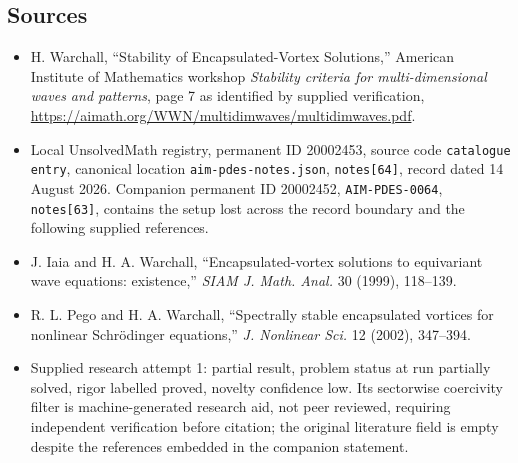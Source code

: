\documentclass[11pt]{article}
\begin{document}
\subsection{Sources}
\begin{itemize}
\item H. Warchall, ``Stability of Encapsulated-Vortex Solutions,'' American Institute of Mathematics workshop \emph{Stability criteria for multi-dimensional waves and patterns}, page 7 as identified by supplied verification, \url{https://aimath.org/WWN/multidimwaves/multidimwaves.pdf}.
\item Local UnsolvedMath registry, permanent ID 20002453, source code \texttt{catalogue entry}, canonical location \texttt{aim-pdes-notes.json}, \texttt{notes[64]}, record dated 14 August 2026. Companion permanent ID 20002452, \texttt{AIM-PDES-0064}, \texttt{notes[63]}, contains the setup lost across the record boundary and the following supplied references.
\item J. Iaia and H. A. Warchall, ``Encapsulated-vortex solutions to equivariant wave equations: existence,'' \emph{SIAM J. Math. Anal.} 30 (1999), 118--139.
\item R. L. Pego and H. A. Warchall, ``Spectrally stable encapsulated vortices for nonlinear Schr\"odinger equations,'' \emph{J. Nonlinear Sci.} 12 (2002), 347--394.
\item Supplied research attempt 1: partial result, problem status at run partially solved, rigor labelled proved, novelty confidence low. Its sectorwise coercivity filter is machine-generated research aid, not peer reviewed, requiring independent verification before citation; the original literature field is empty despite the references embedded in the companion statement.
\end{itemize}
\end{document}
